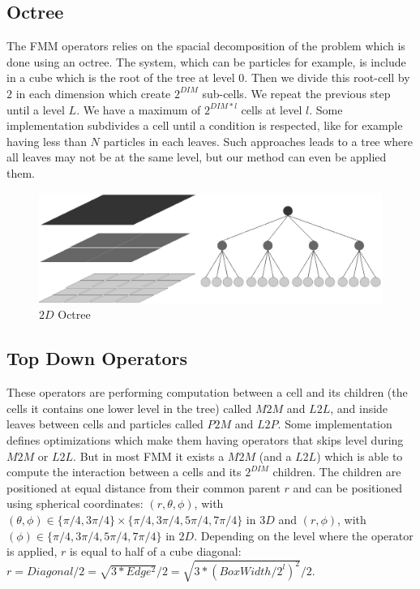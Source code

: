 \documentclass[12pt]{article} %
\begin{document}
\subsection{Octree}
The FMM operators relies on the spacial decomposition of the problem which is done using an octree.
The system, which can be particles for example, is include in a cube which is the root of the tree at level $0$.
Then we divide this root-cell by $2$ in each dimension which create $2^{DIM}$ sub-cells.
We repeat the previous step until a level $L$. We have a maximum of $2^{DIM*l}$ cells at level $l$.
Some implementation subdivides a cell until a condition is respected, like for example having less than $N$ particles in each leaves.
Such approaches leads to a tree where all leaves may not be at the same level, but our method can even be applied them.

\begin{figure}[h]
\centering
\includegraphics[scale=0.6]{Images/Octree}
\caption{$2D$ Octree}
\end{figure}

\subsection{Top Down Operators}
These operators are performing computation between a cell and its children (the cells it contains one lower level in the tree) called $M2M$ and $L2L$,
and inside leaves between cells and particles called $P2M$ and $L2P$.
Some implementation defines optimizations which make them having operators that skips level during $M2M$ or $L2L$.
But in most FMM it exists a $M2M$ (and a $L2L$) which is able to compute the interaction between a cells and its $2^{DIM}$ children.
The children are positioned at equal distance from their common parent $r$ and can be positioned using spherical coordinates:
$(r,\theta,\phi)$, with $(\theta,\phi) \in \{\pi/4,3\pi/4\} \times \{\pi/4, 3\pi/4, 5\pi/4, 7\pi/4\}$ in $3D$ and
$(r,\phi)$, with $(\phi) \in \{\pi/4, 3\pi/4, 5\pi/4, 7\pi/4\}$ in $2D$.
Depending on the level where the operator is applied, $r$ is equal to half of a cube diagonal:
$r = Diagonal/2 = \sqrt{ 3 * Edge^2 }/2 = \sqrt{ 3 * (BoxWidth/2^{l})^2 }/2$.
\end{document}
